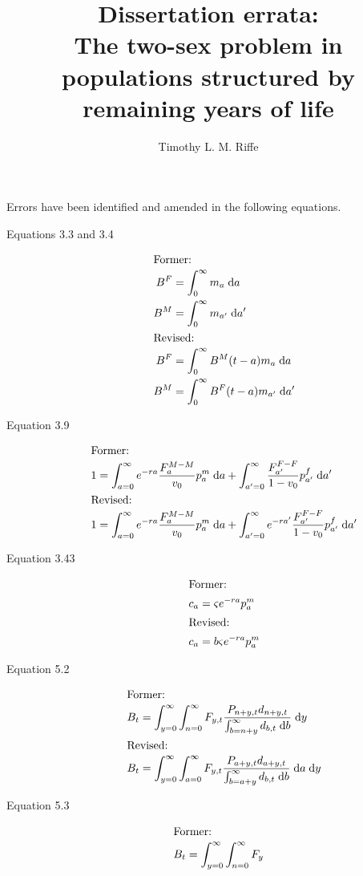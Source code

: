 \documentclass{article}
\newcommand{\dd}{\; \mathrm{d}}
\begin{document}
\title{Dissertation errata: \\The two-sex problem in populations structured by
remaining years of life}
\author{Timothy L. M. Riffe}
\maketitle

Errors have been identified and amended in the following equations.
\begin{description}
\item[Equations 3.3 and 3.4]
\begin{align}
\intertext{Former:}
B^F &= \int_0^\infty m_a \dd a \notag \\
B^M &= \int_0^\infty m_{a'} \dd a'\notag \\
\intertext{Revised:}
B^F &= \int_0^\infty B^M(t-a)m_a \dd a \notag \\
B^M &= \int_0^\infty B^F(t-a)m_{a'} \dd a'\notag 
\end{align}
\item[Equation 3.9]
\begin{align}
\intertext{Former:}
1 &= \int _{a=0} ^\infty e^{-r a} \frac{F_a ^{M-M}}{v_0} p_a^m \dd a + \int
_{a'=0} ^\infty \frac{F_{a'} ^{F-F}}{1 - v_0} p_{a'}^f \dd a' \notag \\
\intertext{Revised:}
1 &= \int _{a=0} ^\infty e^{-r a} \frac{F_a ^{M-M}}{v_0} p_a^m \dd a + \int
_{a'=0} ^\infty e^{-r a'} \frac{F_{a'} ^{F-F}}{1 - v_0} p_{a'}^f \dd a' \notag
\end{align}
\item[Equation 3.43]
\begin{align}
\intertext{Former:}
c_a &=  \varsigma  e^{-ra} p_a^m \notag \\
\intertext{Revised:}
c_a &=  b\varsigma  e^{-ra} p_a^m \notag \\
\end{align}
\item[Equation 5.2] 
\begin{align}
\intertext{Former:}
B_t &= \int_{y=0}^\infty \int_{n=0}^\infty F_{y,t}
\frac{P_{n+y,t}d_{n+y,t}}{\int_{b=n+y}^\infty d_{b,t} \dd b} \dd y \notag\\
\intertext{Revised:}
B_t &= \int_{y=0}^\infty \int_{a=0}^\infty F_{y,t}
\frac{P_{a+y,t}d_{a+y,t}}{\int_{b=a+y}^\infty d_{b,t} \dd b} \dd a \dd y \notag
\end{align}
\item[Equation 5.3]
\begin{align}
\intertext{Former:}
B_t &= \int_{y=0}^\infty \int_{n=0}^\infty F_y

\end{align}
\end{description}
\end{document}
